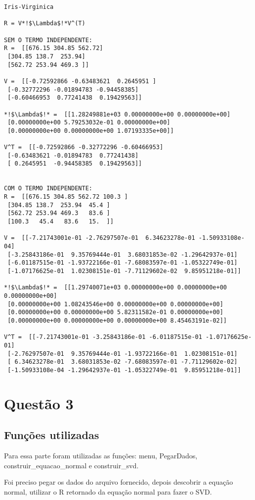 \documentclass[a4paper,12pt,twoside]{article}
\begin{document}
\begin{lstlisting}
Iris-Virginica

R = V*!$\Lambda$!*V^(T)

SEM O TERMO INDEPENDENTE: 
R =  [[676.15 304.85 562.72]
 [304.85 138.7  253.94]
 [562.72 253.94 469.3 ]]

V =  [[-0.72592866 -0.63483621  0.2645951 ]
 [-0.32772296 -0.01894783 -0.94458385]
 [-0.60466953  0.77241438  0.19429563]]

*!$\Lambda$!* =  [[1.28249881e+03 0.00000000e+00 0.00000000e+00]
 [0.00000000e+00 5.79253032e-01 0.00000000e+00]
 [0.00000000e+00 0.00000000e+00 1.07193335e+00]]

V^T =  [[-0.72592866 -0.32772296 -0.60466953]
 [-0.63483621 -0.01894783  0.77241438]
 [ 0.2645951  -0.94458385  0.19429563]]


COM O TERMO INDEPENDENTE: 
R =  [[676.15 304.85 562.72 100.3 ]
 [304.85 138.7  253.94  45.4 ]
 [562.72 253.94 469.3   83.6 ]
 [100.3   45.4   83.6   15.  ]]

V =  [[-7.21743001e-01 -2.76297507e-01  6.34623278e-01 -1.50933108e-04]
 [-3.25843186e-01  9.35769444e-01  3.68031853e-02 -1.29642937e-01]
 [-6.01187515e-01 -1.93722166e-01 -7.68083597e-01 -1.05322749e-01]
 [-1.07176625e-01  1.02308151e-01 -7.71129602e-02  9.85951218e-01]]

*!$\Lambda$!* =  [[1.29740071e+03 0.00000000e+00 0.00000000e+00 0.00000000e+00]
 [0.00000000e+00 1.08243546e+00 0.00000000e+00 0.00000000e+00]
 [0.00000000e+00 0.00000000e+00 5.82311582e-01 0.00000000e+00]
 [0.00000000e+00 0.00000000e+00 0.00000000e+00 8.45463191e-02]]

V^T =  [[-7.21743001e-01 -3.25843186e-01 -6.01187515e-01 -1.07176625e-01]
 [-2.76297507e-01  9.35769444e-01 -1.93722166e-01  1.02308151e-01]
 [ 6.34623278e-01  3.68031853e-02 -7.68083597e-01 -7.71129602e-02]
 [-1.50933108e-04 -1.29642937e-01 -1.05322749e-01  9.85951218e-01]]
\end{lstlisting}

\section{Questão 3}
\subsection{Funções utilizadas}
    Para essa parte foram utilizadas as funções: menu, PegarDados, construir\_equacao\_normal e construir\_svd.
    
Foi preciso pegar os dados do arquivo fornecido, depois descobrir a equação normal, utilizar o R retornado da equação normal para fazer o SVD.
\end{document}
